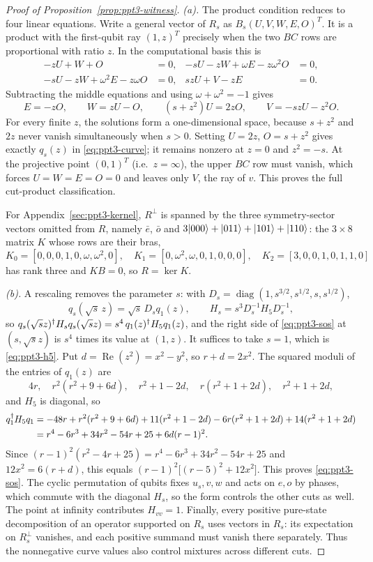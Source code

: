 \begin{proof}[Proof of Proposition~\ref{prop:ppt3-witness}]
\emph{(a).} The product condition reduces to four linear equations. Write a general vector of $R_s$ as
$B_s(U,V,W,E,O)^T$. It is a product with the first-qubit ray
$(1,z)^T$ precisely when the two $BC$ rows are proportional
with ratio $z$. In the computational basis this is
\[
\begin{aligned}
-zU+W+O&=0,&
-sU-zW+\omega E-z\omega^2O&=0,\\
-sU-zW+\omega^2E-z\omega O&=0,&
szU+V-zE&=0.
\end{aligned}
\]
Subtracting the middle equations and using
$\omega+\omega^2=-1$ gives
\[
 E=-zO,\qquad W=zU-O,\qquad
 (s+z^2)U=2zO,\qquad V=-szU-z^2O.
\]
For every finite $z$, the solutions form a one-dimensional
space, because $s+z^2$ and $2z$ never vanish simultaneously
when $s>0$. Setting $U=2z$, $O=s+z^2$ gives exactly
$q_s(z)$ in \eqref{eq:ppt3-curve}; it remains nonzero at
$z=0$ and $z^2=-s$. At the projective point
$(0,1)^T$ (i.e.\ $z=\infty$), the upper $BC$ row must
vanish, which forces $U=W=E=O=0$ and leaves only $V$,
the ray of $v$. This proves the full cut-product classification.

For Appendix~\ref{sec:ppt3-kernel}, $R^\perp$ is spanned by the three symmetry-sector vectors omitted from $R$, namely
$\bar e$, $\bar o$ and $3\lvert000\rangle+\lvert011\rangle+\lvert101\rangle+\lvert110\rangle$: the $3\times8$ matrix $K$ whose rows are their bras,
\[
K_0=[0,0,0,1,0,\omega,\omega^2,0],\quad
K_1=[0,\omega^2,\omega,0,1,0,0,0],\quad
K_2=[3,0,0,1,0,1,1,0]
\]
has rank three and $KB=0$, so $R=\ker K$.

\emph{(b).} A rescaling removes the parameter $s$: with
$D_s=\operatorname{diag}(1,s^{3/2},s^{1/2},s,s^{1/2})$,
\[
 q_s(\sqrt s\,z)=\sqrt s\,D_sq_1(z),\qquad
 H_s=s^3D_s^{-1}H_5D_s^{-1},
\]
so $q_s(\sqrt s z)^{\dagger} H_sq_s(\sqrt s z)=s^4\,q_1(z)^{\dagger} H_5q_1(z)$, and the right side of \eqref{eq:ppt3-sos} at
$(s,\sqrt s z)$ is $s^4$ times its value at $(1,z)$. It suffices to take $s=1$, which is \eqref{eq:ppt3-h5}. Put $d=\operatorname{Re}(z^2)=x^2-y^2$, so
$r+d=2x^2$. The squared moduli of the entries of $q_1(z)$ are
\[
4r,\quad r^2(r^2+9+6d),\quad r^2+1-2d,\quad r(r^2+1+2d),\quad r^2+1+2d,
\]
and $H_5$ is diagonal, so
\begin{align*}
q_1^{\dagger} H_5q_1&=-48r+r^2(r^2+9+6d)+11(r^2+1-2d)-6r(r^2+1+2d)+14(r^2+1+2d)\\
&=r^4-6r^3+34r^2-54r+25+6d(r-1)^2 .
\end{align*}
Since $(r-1)^2(r^2-4r+25)=r^4-6r^3+34r^2-54r+25$ and $12x^2=6(r+d)$, this equals
$(r-1)^2\bigl[(r-5)^2+12x^2\bigr]$. This proves \eqref{eq:ppt3-sos}.
The cyclic permutation of qubits fixes $u_s,v,w$ and
acts on $e,o$ by phases, which commute with the diagonal $H_s$, so the form controls the other cuts as well.
The point at infinity contributes $H_{vv}=1$. Finally, every positive pure-state decomposition of an operator
supported on $R_s$ uses vectors in $R_s$: its expectation
on $R_s^\perp$ vanishes, and each positive summand must
vanish there separately. Thus the nonnegative curve
values also control mixtures across different cuts.
\end{proof}

